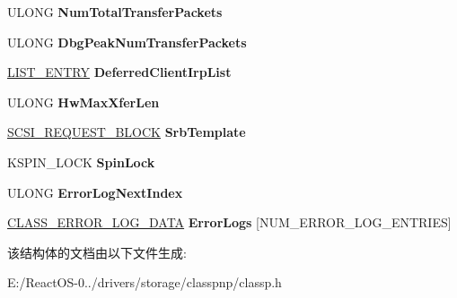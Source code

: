 \begin{DoxyCompactItemize}
U\+L\+O\+NG {\bfseries Num\+Total\+Transfer\+Packets}
\item 
\mbox{\label{struct___c_l_a_s_s___p_r_i_v_a_t_e___f_d_o___d_a_t_a_a8d552d385787b2a0d10ac49b8fe4c7b9}} 
U\+L\+O\+NG {\bfseries Dbg\+Peak\+Num\+Transfer\+Packets}
\item 
\mbox{\label{struct___c_l_a_s_s___p_r_i_v_a_t_e___f_d_o___d_a_t_a_a5f80efe74a51f697d7a16fd2f37737cb}} 
\hyperlink{struct___l_i_s_t___e_n_t_r_y}{L\+I\+S\+T\+\_\+\+E\+N\+T\+RY} {\bfseries Deferred\+Client\+Irp\+List}
\item 
\mbox{\label{struct___c_l_a_s_s___p_r_i_v_a_t_e___f_d_o___d_a_t_a_a32bd03995ed33fc38635d719283a710d}} 
U\+L\+O\+NG {\bfseries Hw\+Max\+Xfer\+Len}
\item 
\mbox{\label{struct___c_l_a_s_s___p_r_i_v_a_t_e___f_d_o___d_a_t_a_a12c25f1978e906527b46835511ea91eb}} 
\hyperlink{struct___s_c_s_i___r_e_q_u_e_s_t___b_l_o_c_k}{S\+C\+S\+I\+\_\+\+R\+E\+Q\+U\+E\+S\+T\+\_\+\+B\+L\+O\+CK} {\bfseries Srb\+Template}
\item 
\mbox{\label{struct___c_l_a_s_s___p_r_i_v_a_t_e___f_d_o___d_a_t_a_aaa8f780af4dea02aa0c1da1211cebd30}} 
K\+S\+P\+I\+N\+\_\+\+L\+O\+CK {\bfseries Spin\+Lock}
\item 
\mbox{\label{struct___c_l_a_s_s___p_r_i_v_a_t_e___f_d_o___d_a_t_a_aabaff24461059190b4e01054ee3c48d0}} 
U\+L\+O\+NG {\bfseries Error\+Log\+Next\+Index}
\item 
\mbox{\label{struct___c_l_a_s_s___p_r_i_v_a_t_e___f_d_o___d_a_t_a_ae4aad70c518aa6ca661e9f6d0fc4cfc4}} 
\hyperlink{struct___c_l_a_s_s___e_r_r_o_r___l_o_g___d_a_t_a}{C\+L\+A\+S\+S\+\_\+\+E\+R\+R\+O\+R\+\_\+\+L\+O\+G\+\_\+\+D\+A\+TA} {\bfseries Error\+Logs} \mbox{[}N\+U\+M\+\_\+\+E\+R\+R\+O\+R\+\_\+\+L\+O\+G\+\_\+\+E\+N\+T\+R\+I\+ES\mbox{]}
\end{DoxyCompactItemize}


该结构体的文档由以下文件生成\+:\begin{DoxyCompactItemize}
\item 
E\+:/\+React\+O\+S-\/0../drivers/storage/classpnp/classp.\+h\end{DoxyCompactItemize}
